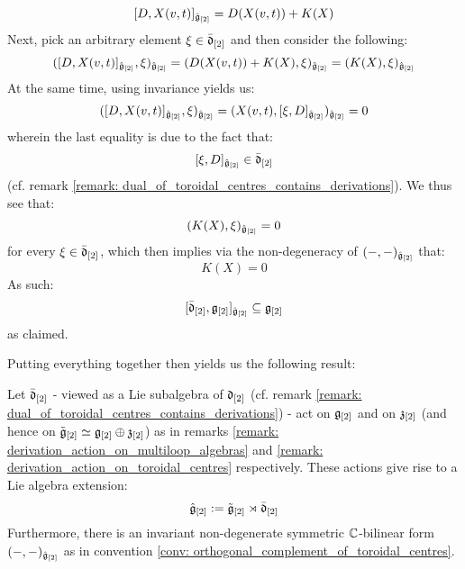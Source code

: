 \begin{remark}
                    $$[ D, X(v, t) ]_{\hat{\mathfrak{g}}_{[2]}} = D( X(v, t) ) + K(X)$$
                Next, pick an arbitrary element $\xi \in \bar{\mathfrak{d}}_{[2]}$ and then consider the following:
                    $$( [ D, X(v, t) ]_{\hat{\mathfrak{g}}_{[2]}}, \xi )_{\hat{\mathfrak{g}}_{[2]}} = (D( X(v, t) ) + K(X), \xi)_{\hat{\mathfrak{g}}_{[2]}} = (K(X), \xi)_{\hat{\mathfrak{g}}_{[2]}}$$
                At the same time, using invariance yields us:
                    $$( [ D, X(v, t) ]_{\hat{\mathfrak{g}}_{[2]}}, \xi )_{\hat{\mathfrak{g}}_{[2]}} = (X(v, t), [\xi, D]_{\hat{\mathfrak{g}}_{[2]}})_{\hat{\mathfrak{g}}_{[2]}} = 0$$
                wherein the last equality is due to the fact that:
                    $$[\xi, D]_{\hat{\mathfrak{g}}_{[2]}} \in \bar{\mathfrak{d}}_{[2]}$$
                (cf. remark \ref{remark: dual_of_toroidal_centres_contains_derivations}). We thus see that:
                    $$(K(X), \xi)_{\hat{\mathfrak{g}}_{[2]}} = 0$$
                for every $\xi \in \bar{\mathfrak{d}}_{[2]}$, which then implies via the non-degeneracy of $(-, -)_{\hat{\mathfrak{g}}_{[2]}}$ that:
                    $$K(X) = 0$$
                As such:
                    $$[ \bar{\mathfrak{d}}_{[2]}, \mathfrak{g}_{[2]} ]_{\hat{\mathfrak{g}}_{[2]}} \subseteq \mathfrak{g}_{[2]}$$
                as claimed. 
            \end{remark}

            Putting everything together then yields us the following result:
            \begin{proposition} \label{prop: extended_toroidal_lie_algebras}
                Let $\bar{\mathfrak{d}}_{[2]}$ - viewed as a Lie subalgebra of $\mathfrak{d}_{[2]}$ (cf. remark \ref{remark: dual_of_toroidal_centres_contains_derivations}) - act on $\mathfrak{g}_{[2]}$ and on $\mathfrak{z}_{[2]}$ (and hence on $\tilde{\mathfrak{g}}_{[2]}\simeq \mathfrak{g}_{[2]} \oplus \mathfrak{z}_{[2]}$) as in remarks \ref{remark: derivation_action_on_multiloop_algebras} and \ref{remark: derivation_action_on_toroidal_centres} respectively. These actions give rise to a Lie algebra extension:
                    $$\hat{\mathfrak{g}}_{[2]} := \tilde{\mathfrak{g}}_{[2]}\rtimes \bar{\mathfrak{d}}_{[2]}$$
                Furthermore, there is an invariant non-degenerate symmetric $\mathbb{C}$-bilinear form $(-, -)_{\hat{\mathfrak{g}}_{[2]}}$ as in convention \ref{conv: orthogonal_complement_of_toroidal_centres}. 
            \end{proposition}

